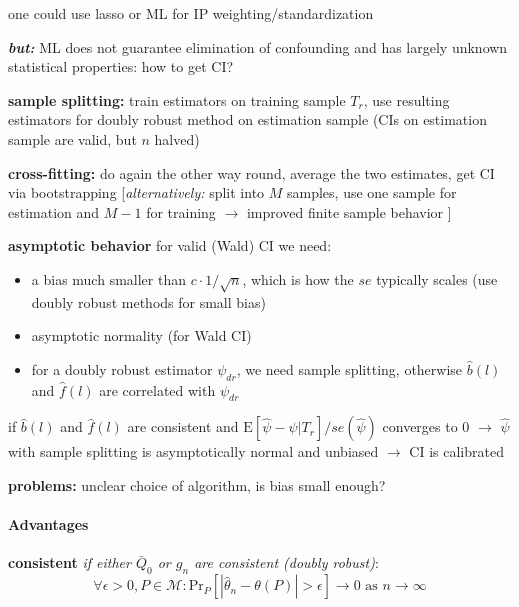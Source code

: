 \documentclass[8pt,twoside]{extarticle}
\begin{document}
\begin{multicols}{2}
 one could use lasso or ML for IP weighting/standardization

 \textbf{\textit{but:}} ML does not guarantee elimination of confounding and has largely unknown statistical properties: how to get CI?

 \textbf{sample splitting:} train estimators on training sample $T_r$, use resulting estimators for doubly robust method on estimation sample (CIs on estimation sample are valid, but $n$ halved)

 \textbf{cross-fitting:} do again the other way round, average the two estimates, get CI via bootstrapping
[\textit{alternatively:} split into $M$ samples, use one sample for estimation and $M{-}1$ for training $\to$ improved finite sample behavior \citep{hernan2023causal}]



 \textbf{asymptotic behavior} 
for valid (Wald) CI we need:
\begin{itemize}[leftmargin=*, itemsep=0em, topsep=0pt, partopsep=0pt,parsep=0pt]
\item a bias  much smaller than $c \cdot 1/\sqrt{n}$, which is how the $se$ typically scales (use doubly robust methods for small bias)
\item asymptotic normality (for Wald CI)
\item for a doubly robust estimator $\psi_{dr}$, we need sample splitting, otherwise $\hat{b}(l)$ and $\hat{f}(l)$ are correlated with $\psi_{dr}$
\end{itemize}

 if $\hat{b}(l)$ and $\hat{f}(l)$ are consistent and $\mathrm{E}[\hat{\psi} - \psi|T_r]/se(\hat{\psi})$ converges to 0 $\to$ $\hat{\psi}$ with sample splitting is asymptotically normal and unbiased $\to$ CI is calibrated
\citep{hernan2023causal}


 \textbf{problems:} unclear choice of algorithm, is bias small enough?

\paragraph{Advantages} \citep{van2011targeted}

 \textbf{consistent} \textit{if either $\bar{Q}_0$ or $g_n$ are consistent (doubly robust)}:
$$\forall \epsilon>0, P \in \mathcal{M}: \mathrm{Pr}_P\left[|\hat{\theta}_n-\theta(P)|>\epsilon\right] \to 0 \text{ as } n\to\infty$$


\end{multicols}
\end{document}
